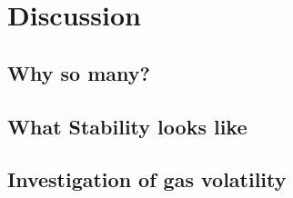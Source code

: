 

\section{Discussion}

\subsection{Why so many?}


\subsection{What Stability looks like}\label{sec:stability}

\subsection{Investigation of gas volatility}\label{sec:GasInvs}

